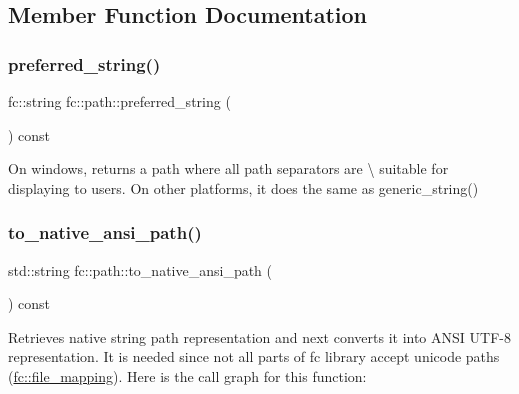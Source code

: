 \subsection{Member Function Documentation}
\mbox{\label{classfc_1_1path_a9708f850e21e668a29523fbe6c4d0dca}} 
\subsubsection{\texorpdfstring{preferred\+\_\+string()}{preferred\_string()}}
{\footnotesize\ttfamily fc\+::string fc\+::path\+::preferred\+\_\+string (\begin{DoxyParamCaption}{ }\end{DoxyParamCaption}) const}

On windows, returns a path where all path separators are \textquotesingle{}\textbackslash{}\textquotesingle{} suitable for displaying to users. On other platforms, it does the same as generic\+\_\+string() \mbox{\label{classfc_1_1path_a9712c4ccfcfc54e02cc913510a858733}} 
\subsubsection{\texorpdfstring{to\+\_\+native\+\_\+ansi\+\_\+path()}{to\_native\_ansi\_path()}}
{\footnotesize\ttfamily std\+::string fc\+::path\+::to\+\_\+native\+\_\+ansi\+\_\+path (\begin{DoxyParamCaption}{ }\end{DoxyParamCaption}) const}

Retrieves native string path representation and next converts it into A\+N\+SI U\+T\+F-\/8 representation. It is needed since not all parts of fc library accept unicode paths (\mbox{\hyperlink{classfc_1_1file__mapping}{fc\+::file\+\_\+mapping}}). Here is the call graph for this function\+:
\mbox{\label{classfc_1_1path_a12a75eca015d0c9880e2c062e371d08d}} 
